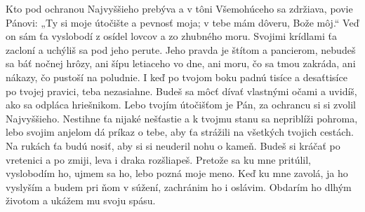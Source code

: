 Kto pod ochranou Najvyššieho prebýva
a v tôni Všemohúceho sa zdržiava,
\versseparator
povie Pánovi: „Ty si moje útočište
a pevnosť moja; v tebe mám dôveru, Bože môj.“
\versseparator
Veď on sám ťa vyslobodí z osídel lovcov
a zo zhubného moru.
\versseparator
Svojimi krídlami ťa zacloní
a uchýliš sa pod jeho perute.
\versseparator
Jeho pravda je štítom a pancierom,
nebudeš sa báť nočnej hrôzy,
\versseparator
ani šípu letiaceho vo dne,
ani moru, čo sa tmou zakráda,
ani nákazy, čo pustoší na poludnie.
\versseparator
I keď po tvojom boku padnú tisíce
a desaťtisíce po tvojej pravici,
teba nezasiahne.
\versseparator
Budeš sa môcť dívať vlastnými očami
a uvidíš, ako sa odpláca hriešnikom.
\versseparator
Lebo tvojím útočišťom je Pán,
za ochrancu si si zvolil Najvyššieho.
\versseparator
Nestihne ťa nijaké nešťastie
a k tvojmu stanu sa nepriblíži pohroma,
\versseparator
lebo svojim anjelom dá príkaz o tebe,
aby ťa strážili na všetkých tvojich cestách.
\versseparator
Na rukách ťa budú nosiť,
aby si si neuderil nohu o kameň.
\versseparator
Budeš si kráčať po vretenici a po zmiji,
leva i draka rozšliapeš.
\versseparator
Pretože sa ku mne pritúlil, vyslobodím ho,
ujmem sa ho, lebo pozná moje meno.
\versseparator
Keď ku mne zavolá, ja ho vyslyším
a budem pri ňom v súžení,
zachránim ho i oslávim.
\versseparator
Obdarím ho dlhým životom
a ukážem mu svoju spásu.